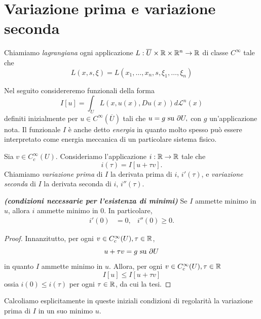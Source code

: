 \section{Variazione prima e variazione seconda}
\begin{definizione}
	Chiamiamo \emph{lagrangiana} ogni applicazione $L: \overline{U} \times \mathbb{R} \times \mathbb{R}^n \to \mathbb{R}$ di classe $C^\infty$ tale che
	\[ L(x,s,\xi) = L(x_1,\dots,x_n, s, \xi_1,\dots,\xi_n) \]
\end{definizione}
Nel seguito considereremo funzionali della forma
\[ I[u] = \int_U L(x,u(x),Du(x))d\mathcal{L}^n(x) \]
definiti inizialmente per $u \in C^\infty(\overline{U})$ tali che $u= g \textup{ su } \partial U,$ con $g$ un'applicazione nota. Il funzionale $I$ è anche detto \emph{energia} in quanto molto spesso può essere interpretato come energia meccanica di un particolare sistema fisico.
\begin{definizione}
	Sia $v \in C^\infty_c(U)$. Consideriamo l'applicazione $i: \mathbb{R} \to \mathbb{R}$ tale che
	\[  i(\tau) = I[u+\tau v].\]
	Chiamiamo \emph{variazione prima} di $I$ la derivata prima di $i$, $i'(\tau)$, e \emph{variazione seconda} di $I$ la derivata seconda di $i$, $i''(\tau)$.
\end{definizione}
\begin{proposizione}\emph{\textbf{(condizioni necessarie per l'esistenza di minimi)}}
	Se $I$ ammette minimo in $u$, allora $i$ ammette minimo in $0$. In particolare, 
	\begin{align*}
		i'(0) &= 0, & i''(0)\ge 0.
	\end{align*}
	
	\begin{proof}
		Innanzitutto, per ogni $v \in C^\infty_c(U), \tau \in \mathbb{R}$, 
		\[ u + \tau v = g \textup{ su } \partial U \]
		in quanto $I$ ammette minimo in $u$. Allora, per ogni $v \in C^\infty_c(U), \tau \in \mathbb{R}$
		\[ I[u] \le I[u + \tau v] \]
		ossia $i(0) \le i(\tau)$ per ogni $\tau \in \mathbb{R}$, da cui la tesi.
	\end{proof}
\end{proposizione}
Calcoliamo esplicitamente in queste iniziali condizioni di regolarità la variazione prima di $I$ in un suo minimo $u$. 


